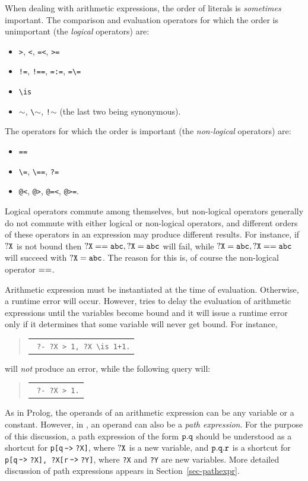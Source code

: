 \documentclass[11pt]{article}
\newcommand{\ERGO}{\mbox{\smaller{\ensuremath{\cal{E}}\smaller{{\sc{RGO}}}}}\xspace}
\newcommand{\FLSYSTEM}{\ERGO}
\newenvironment{qrules}{\begin{quote}\tt\begin{tabular}[t]{l}}%
{\end{tabular}\end{quote}}
\newcommand{\mvd}{{\mbox{\tt \,->\,}}}  %
\newcommand{\bs}{\textbackslash}
\begin{document}
When dealing with arithmetic expressions, the order of literals is
\emph{sometimes} important.
The comparison and evaluation operators for which the order is unimportant
(the \emph{logical} operators)  are:
\begin{itemize}
\item  \texttt{>}, \texttt{<}, \texttt{=<}, \texttt{>=}
\item  \texttt{!=}, \texttt{!==}, \texttt{=:=}, \texttt{=\bs=}
\item \texttt{\bs{}is}
\item \texttt{$\sim$}, \texttt{\bs$\sim$}, \texttt{!$\sim$} (the last
  two being synonymous).
\end{itemize}
The operators for which the order is important (the \emph{non-logical}
operators) are:
\begin{itemize}
\item  \texttt{==}
\item  \texttt{\bs=}, \texttt{\bs==}, \texttt{?=}
\item  \texttt{@<}, \texttt{@>}, \texttt{@=<}, \texttt{@>=}.  
\end{itemize}
Logical operators commute among themselves, but non-logical operators
generally do not commute with either logical or non-logical operators, and
different orders of these operators in an expression  may produce different
results. For instance, if $\tt ?X$ is not bound then $\tt ?X == abc, ?X=abc$ will
fail, while  $\tt ?X=abc, ?X == abc$ will succeed with $\tt ?X = abc$.
The reason for this is, of course the non-logical operator $\tt ==$.

Arithmetic expression must be instantiated at the time of
evaluation. Otherwise, a runtime error will occur.
However, \FLSYSTEM tries to delay the evaluation of arithmetic expressions
until the variables become bound and it will issue a runtime error only if
it determines that some variable will never get bound.
For instance,
\begin{qrules}
  \tt
?- ?X > 1, ?X \bs{}is 1+1.
\end{qrules}
will \emph{not}  produce an error, while the following query will:
\begin{qrules}
  \tt
?-  ?X > 1.
\end{qrules}

As in Prolog, the operands of an arithmetic expression can be any variable
or a constant. However, in \FLSYSTEM, an operand can also be a \emph{path
  expression}. For the purpose of this discussion, a path expression of the
form $\tt p.q$ should be understood as a shortcut for {\tt p[q$\mvd$?X]}, where
$\tt ?X$ is a new variable, and $\tt p.q.r$ is a shortcut for {\tt p[q$\mvd$?X],
  ?X[r$\mvd$?Y]}, where \texttt{?X} and \texttt{?Y} are new variables.
More detailed discussion
of path expressions appears in Section~\ref{sec-pathexpr}.
\end{document}
